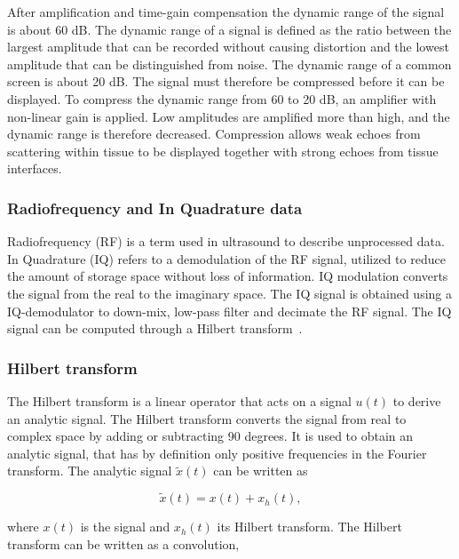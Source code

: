 After amplification and time-gain compensation the dynamic range of the signal is about 60 dB. The dynamic range of a signal is defined as the ratio between the largest amplitude that can be recorded without causing distortion and the lowest amplitude that can be distinguished from noise. The dynamic range of a common screen is about 20 dB. The signal must therefore be compressed before it can be displayed. To compress the dynamic range from 60 to 20 dB, an amplifier with non-linear gain is applied. Low amplitudes are amplified more than high, and the dynamic range is therefore decreased. Compression allows weak echoes from scattering within tissue to be displayed together with strong echoes from tissue interfaces.

\subsubsection{Radiofrequency and In Quadrature data}
Radiofrequency (RF) is a term used in ultrasound to describe unprocessed data. In Quadrature (IQ) refers to a demodulation of the RF signal, utilized to reduce the amount of storage space without loss of information. IQ modulation converts the signal from the real to the imaginary space. The IQ signal is obtained using a IQ-demodulator to down-mix, low-pass filter and decimate the RF signal. The IQ signal can be computed through a Hilbert transform~\cite{Kirkhorn1999}.

\subsubsection{Hilbert transform}
The Hilbert transform is a linear operator that acts on a signal $u(t)$ to derive an analytic signal. The Hilbert transform converts the signal from real to complex space by adding or subtracting 90 degrees. It is used to obtain an analytic signal, that has by definition only positive frequencies in the Fourier transform. The analytic signal $\tilde{x}(t)$ can be written as

\begin{equation}
\tilde{x}(t) = x(t) + x_h(t),
\end{equation}

where $x(t)$ is the signal and $x_h(t)$ its Hilbert transform. The Hilbert transform can be written as a convolution, 

